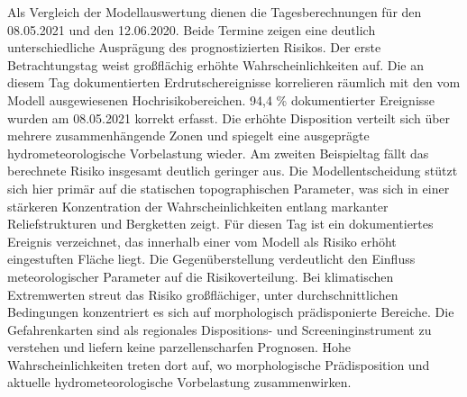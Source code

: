 \documentclass[../main.tex]{subfiles}
\begin{document}
Als Vergleich der Modellauswertung dienen die Tagesberechnungen für den 08.05.2021 und den 12.06.2020. Beide Termine zeigen eine deutlich unterschiedliche Ausprägung des prognostizierten Risikos.
Der erste Betrachtungstag weist großflächig erhöhte Wahrscheinlichkeiten auf. Die an diesem Tag dokumentierten Erdrutschereignisse korrelieren räumlich mit den vom Modell ausgewiesenen Hochrisikobereichen. 94,4 \% dokumentierter Ereignisse wurden am 08.05.2021 korrekt erfasst.
Die erhöhte Disposition verteilt sich über mehrere zusammenhängende Zonen und spiegelt eine ausgeprägte hydrometeorologische Vorbelastung wieder.
Am zweiten Beispieltag fällt das berechnete Risiko insgesamt deutlich geringer aus. Die Modellentscheidung stützt sich hier primär auf die statischen topographischen Parameter, was sich in einer stärkeren Konzentration der Wahrscheinlichkeiten entlang markanter Reliefstrukturen und Bergketten zeigt. Für diesen Tag ist ein dokumentiertes Ereignis verzeichnet, das innerhalb einer vom Modell als Risiko erhöht eingestuften Fläche liegt.
Die Gegenüberstellung verdeutlicht den Einfluss meteorologischer Parameter auf die Risikoverteilung. Bei klimatischen Extremwerten streut das Risiko großflächiger, unter durchschnittlichen Bedingungen konzentriert es sich auf morphologisch prädisponierte Bereiche. Die Gefahrenkarten sind als regionales Dispositions- und Screeninginstrument zu verstehen und liefern keine parzellenscharfen Prognosen. Hohe Wahrscheinlichkeiten treten dort auf, wo morphologische Prädisposition und aktuelle hydrometeorologische Vorbelastung zusammenwirken.
\end{document}

